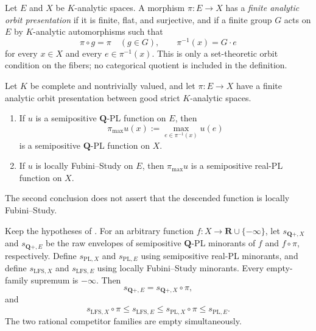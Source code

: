 
\begin{definition}
\label{def:p031-finite-analytic-orbit-presentation}
Let $E$ and $X$ be $K$-analytic spaces.  A morphism
$\pi:E\to X$ has a \emph{finite analytic orbit presentation} if it is
finite, flat, and surjective, and if a finite group $G$ acts on $E$ by
$K$-analytic automorphisms such that
\begin{equation}
\label{eq:p031-action-over-base}
              \pi\circ g=\pi\quad(g\in G),
              \qquad
              \pi^{-1}(x)=G\cdot e
\end{equation}
for every $x\in X$ and every $e\in\pi^{-1}(x)$.  This is only a
set-theoretic orbit condition on the fibers; no categorical quotient is
included in the definition.
\end{definition}

\begin{theorem}
\label{thm:p031-orbit-fiber-maximum}
Let $K$ be complete and nontrivially valued, and let
$\pi:E\to X$ have a finite analytic orbit presentation between good strict
$K$-analytic spaces.
\begin{enumerate}
\item If $u$ is a semipositive $\mathbf Q$-PL function on $E$, then
\begin{equation}
\label{eq:p031-rational-fiber-maximum}
       \pi_{\max}u(x):=\max_{e\in\pi^{-1}(x)}u(e)
\end{equation}
is a semipositive $\mathbf Q$-PL function on $X$.
\item If $u$ is locally Fubini--Study on $E$, then $\pi_{\max}u$ is a
semipositive real-PL function on $X$.
\end{enumerate}
The second conclusion does not assert that the descended function is
locally Fubini--Study.
\end{theorem}

\begin{theorem}
\label{thm:p031-orbit-envelope-comparison}
Keep the hypotheses of .  For an
arbitrary function $f:X\to\mathbf R\cup\{-\infty\}$, let
$s_{\mathbf Q+,X}$ and $s_{\mathbf Q+,E}$ be the raw envelopes of
semipositive $\mathbf Q$-PL minorants of $f$ and $f\circ\pi$,
respectively.  Define $s_{\mathrm{PL},X}$ and $s_{\mathrm{PL},E}$ using
semipositive real-PL minorants, and define $s_{\mathrm{LFS},X}$ and
$s_{\mathrm{LFS},E}$ using locally Fubini--Study minorants.  Every
empty-family supremum is $-\infty$.  Then
\begin{equation}
\label{eq:p031-rational-semipositive-envelope-pullback}
                  s_{\mathbf Q+,E}
                    =s_{\mathbf Q+,X}\circ\pi,
\end{equation}
and
\begin{equation}
\label{eq:p031-lfs-pl-envelope-chain}
 s_{\mathrm{LFS},X}\circ\pi
       \leq s_{\mathrm{LFS},E}
       \leq s_{\mathrm{PL},X}\circ\pi
       \leq s_{\mathrm{PL},E}.
\end{equation}
The two rational competitor families are empty simultaneously.
\end{theorem}

